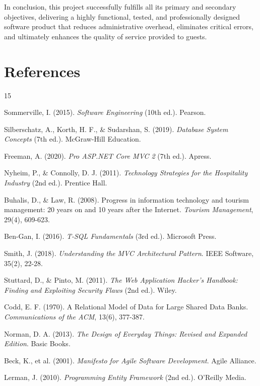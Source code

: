 \documentclass[12pt,a4paper]{article}
\begin{document}
In conclusion, this project successfully fulfills all its primary and secondary objectives, delivering a highly functional, tested, and professionally designed software product that reduces administrative overhead, eliminates critical errors, and ultimately enhances the quality of service provided to guests.

\newpage
\renewcommand{\refname}{\vspace{-2em}}
\section{References}
\begin{thebibliography}{15}

Sommerville, I. (2015). \textit{Software Engineering} (10th ed.). Pearson.

Silberschatz, A., Korth, H. F., \& Sudarshan, S. (2019). \textit{Database System Concepts} (7th ed.). McGraw-Hill Education.

Freeman, A. (2020). \textit{Pro ASP.NET Core MVC 2} (7th ed.). Apress.

Nyheim, P., \& Connolly, D. J. (2011). \textit{Technology Strategies for the Hospitality Industry} (2nd ed.). Prentice Hall.

Buhalis, D., \& Law, R. (2008). Progress in information technology and tourism management: 20 years on and 10 years after the Internet. \textit{Tourism Management}, 29(4), 609-623.

Ben-Gan, I. (2016). \textit{T-SQL Fundamentals} (3rd ed.). Microsoft Press.

Smith, J. (2018). \textit{Understanding the MVC Architectural Pattern}. IEEE Software, 35(2), 22-28.

Stuttard, D., \& Pinto, M. (2011). \textit{The Web Application Hacker's Handbook: Finding and Exploiting Security Flaws} (2nd ed.). Wiley.

Codd, E. F. (1970). A Relational Model of Data for Large Shared Data Banks. \textit{Communications of the ACM}, 13(6), 377-387.

Norman, D. A. (2013). \textit{The Design of Everyday Things: Revised and Expanded Edition}. Basic Books.

Beck, K., et al. (2001). \textit{Manifesto for Agile Software Development}. Agile Alliance.

Lerman, J. (2010). \textit{Programming Entity Framework} (2nd ed.). O'Reilly Media.

\end{thebibliography}
\end{document}
